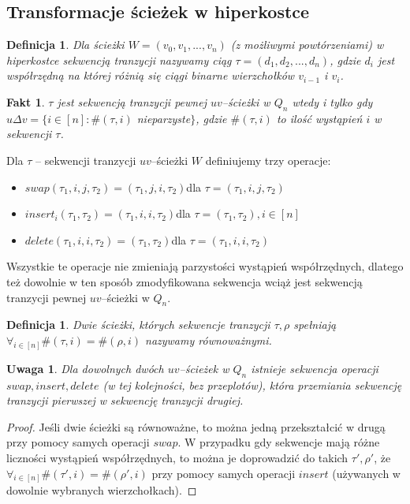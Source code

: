 \documentclass{pracamgr}
\newtheorem{defi}[theorem]{Definicja} %
\newtheorem{remark}[theorem]{Uwaga}
\newtheorem{fact}[theorem]{Fakt}
\begin{document}
  \subsection{Transformacje ścieżek w hiperkostce}
   \begin{defi}\label{sekwencja tranzycji}
     Dla ścieżki $W=(v_0,v_1,...,v_n)$ (z możliwymi powtórzeniami) w hiperkostce \emph{sekwencją tranzycji} nazywamy ciąg $\tau=(d_1,d_2,...,d_n)$,
     gdzie $d_i$ jest współrzędną na której różnią się ciągi binarne wierzchołków $v_{i-1}$ i $v_i$.
    \end{defi}
    \begin{fact}\label{sekwencja tranzycji - parzystość}
     $\tau$ jest sekwencją tranzycji pewnej $uv$--ścieżki w $Q_n$ wtedy i tylko gdy\newline
     $u\Delta v=\{i\in[n]:\#(\tau,i)$ nieparzyste$\}$,
     gdzie $\#(\tau,i)$ to ilość wystąpień $i$ w sekwencji $\tau$.
    \end{fact}
    \noindent
    Dla $\tau$ -- sekwencji tranzycji $uv$--ścieżki $W$ definiujemy trzy operacje:
    \begin{itemize}
     \item $swap(\tau_1,i,j,\tau_2)=(\tau_1,j,i,\tau_2)$\quad dla $\tau=(\tau_1,i,j,\tau_2)$
     \item $insert_i(\tau_1,\tau_2)=(\tau_1,i,i,\tau_2)$\quad dla $\tau=(\tau_1,\tau_2),i\in[n]$
     \item $delete(\tau_1,i,i,\tau_2)=(\tau_1,\tau_2)$\quad dla $\tau=(\tau_1,i,i,\tau_2)$
    \end{itemize}
    Wszystkie te operacje nie zmieniają parzystości wystąpień współrzędnych, dlatego też dowolnie w ten sposób zmodyfikowana sekwencja
    wciąż jest sekwencją tranzycji pewnej $uv$--ścieżki w $Q_n$.
    \begin{defi}\label{sciezki rownowazne}
     Dwie ścieżki, których sekwencje tranzycji $\tau,\rho$ spełniają $\forall_{i\in[n]}\#(\tau,i)=\#(\rho,i)$ nazywamy \emph{równoważnymi}.
    \end{defi}
    \begin{remark}\label{przeksztalcanie sciezek}
     Dla dowolnych dwóch $uv$--ścieżek w $Q_n$ istnieje sekwencja operacji\newline
     $swap, insert, delete$ (w tej kolejności, bez przeplotów),
     która przemiania sekwencję tranzycji pierwszej w sekwencję tranzycji drugiej.
    \end{remark}
    \begin{proof}
     Jeśli dwie ścieżki są równoważne, to można jedną przekształcić w drugą przy pomocy samych operacji $swap$.\newline
     W przypadku gdy sekwencje mają różne liczności wystąpień współrzędnych, to można je doprowadzić do takich $\tau',\rho'$,
     że $\forall_{i\in[n]}\#(\tau',i)=\#(\rho',i)$ przy pomocy samych operacji $insert$ (używanych w dowolnie wybranych wierzchołkach).
    \end{proof}
\end{document}
